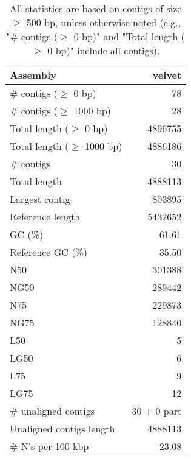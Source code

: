 \documentclass[12pt,a4paper]{article}
\begin{document}
\begin{table}[ht]
\begin{center}
\caption{All statistics are based on contigs of size $\geq$ 500 bp, unless otherwise noted (e.g., "\# contigs ($\geq$ 0 bp)" and "Total length ($\geq$ 0 bp)" include all contigs).}
\begin{tabular}{|l*{1}{|r}|}
\hline
Assembly & velvet \\ \hline
\# contigs ($\geq$ 0 bp) & 78 \\ \hline
\# contigs ($\geq$ 1000 bp) & 28 \\ \hline
Total length ($\geq$ 0 bp) & 4896755 \\ \hline
Total length ($\geq$ 1000 bp) & 4886186 \\ \hline
\# contigs & 30 \\ \hline
Total length & 4888113 \\ \hline
Largest contig & 803895 \\ \hline
Reference length & 5432652 \\ \hline
GC (\%) & 61.61 \\ \hline
Reference GC (\%) & 35.50 \\ \hline
N50 & 301388 \\ \hline
NG50 & 289442 \\ \hline
N75 & 229873 \\ \hline
NG75 & 128840 \\ \hline
L50 & 5 \\ \hline
LG50 & 6 \\ \hline
L75 & 9 \\ \hline
LG75 & 12 \\ \hline
\# unaligned contigs & 30 + 0 part \\ \hline
Unaligned contigs length & 4888113 \\ \hline
\# N's per 100 kbp & 23.08 \\ \hline
\end{tabular}
\end{center}
\end{table}
\end{document}
